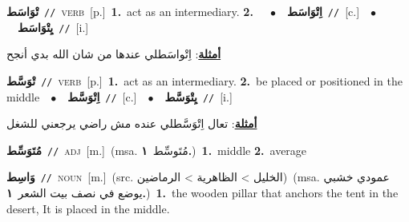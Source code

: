 \documentclass[10pt,a4paper,twoside]{article} %
\begin{document}
\begin{multicols}{2}
{\setlength\topsep{0pt}\textbf{\foreignlanguage{arabic}{تْوَاسَط}}\ {\color{gray}\texttt{//}\color{black}}\ \textsc{verb}\ [p.]\ \textbf{1.}~act as an intermediary.  \textbf{2.}~\ \ $\bullet$\ \ \setlength\topsep{0pt}\textbf{\foreignlanguage{arabic}{اِتْوَاسَط}}\ {\color{gray}\texttt{//}\color{black}}\ [c.]\ \ $\bullet$\ \ \setlength\topsep{0pt}\textbf{\foreignlanguage{arabic}{يِتْوَاسَط}}\ {\color{gray}\texttt{//}\color{black}}\ [i.]\  \begin{flushright}\color{gray}\foreignlanguage{arabic}{\textbf{\underline{\foreignlanguage{arabic}{أمثلة}}}: اِتْواسَطلي عندها من شان الله بدي أنجح}\end{flushright}\color{black}} \vspace{2mm}

{\setlength\topsep{0pt}\textbf{\foreignlanguage{arabic}{تْوَسَّط}}\ {\color{gray}\texttt{//}\color{black}}\ \textsc{verb}\ [p.]\ \textbf{1.}~act as an intermediary.  \textbf{2.}~be placed or positioned in the middle\ \ $\bullet$\ \ \setlength\topsep{0pt}\textbf{\foreignlanguage{arabic}{اِتْوَسَّط}}\ {\color{gray}\texttt{//}\color{black}}\ [c.]\ \ $\bullet$\ \ \setlength\topsep{0pt}\textbf{\foreignlanguage{arabic}{يِتْوَسَّط}}\ {\color{gray}\texttt{//}\color{black}}\ [i.]\  \begin{flushright}\color{gray}\foreignlanguage{arabic}{\textbf{\underline{\foreignlanguage{arabic}{أمثلة}}}: تعال اِتْوَسَّطلي عنده مش راضي يرجعني للشغل}\end{flushright}\color{black}} \vspace{2mm}

{\setlength\topsep{0pt}\textbf{\foreignlanguage{arabic}{مُتَوَسِّط}}\ {\color{gray}\texttt{//}\color{black}}\ \textsc{adj}\ [m.]\ \color{gray}(msa. \foreignlanguage{arabic}{مُتَوسِّط}~\foreignlanguage{arabic}{\textbf{١.}})\color{black}\ \textbf{1.}~middle  \textbf{2.}~average\ } \vspace{2mm}

{\setlength\topsep{0pt}\textbf{\foreignlanguage{arabic}{وَاسِط}}\ {\color{gray}\texttt{//}\color{black}}\ \textsc{noun}\ [m.]\ (src. \color{gray}\foreignlanguage{arabic}{الخليل > الظاهرية > الرماضين}\color{black})\ \color{gray}(msa. \foreignlanguage{arabic}{عمودي خشبي يوضع في نصف بيت الشعر}~\foreignlanguage{arabic}{\textbf{١.}})\color{black}\ \textbf{1.}~the wooden pillar that anchors the tent in the desert, It is placed in the middle.\ } \vspace{2mm}


\end{multicols}
\end{document}
